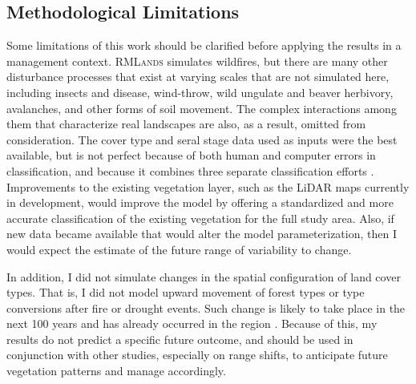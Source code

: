 \subsection*{Methodological Limitations} %
Some limitations of this work should be clarified before applying the results in a management context. \textsc{RMLands} simulates wildfires, but there are many other disturbance processes that exist at varying scales that are not simulated here, including insects and disease, wind-throw, wild ungulate and beaver herbivory, avalanches, and other forms of soil movement. The complex interactions among them that characterize real landscapes are also, as a result, omitted from consideration. %
The cover type and seral stage data used as inputs were the best available, but is not perfect because of both human and computer errors in classification, and because it combines three separate classification efforts \citep{USDAForestService2009}. Improvements to the existing vegetation layer, such as the LiDAR maps currently in development, would improve the model by offering a standardized and more accurate classification of the existing vegetation for the full study area. Also, if new data became available that would alter the model parameterization, then I would expect the estimate of the future range of variability to change. 

In addition, I did not simulate changes in the spatial configuration of land cover types. That is, I did not model upward movement of forest types or type conversions after fire or drought events. Such change is likely to take place in the next 100 years and has already occurred in the region \citep{Bachelet2001}. Because of this, my results do not predict a specific future outcome, and should be used in conjunction with other studies, especially on range shifts, to anticipate future vegetation patterns and manage accordingly. 


